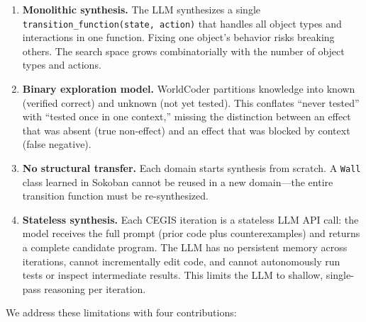 \documentclass{article}
\begin{document}
\begin{enumerate}[nosep]
    \item \textbf{Monolithic synthesis.}  The LLM synthesizes a single
          \texttt{transition\_function(state, action)} that handles all object
          types and interactions in one function.  Fixing one object's behavior
          risks breaking others.  The search space grows combinatorially with
          the number of object types and actions.

    \item \textbf{Binary exploration model.}  WorldCoder partitions knowledge
          into known (verified correct) and unknown (not yet tested).  This
          conflates ``never tested'' with ``tested once in one context,''
          missing the distinction between an effect that was absent (true
          non-effect) and an effect that was blocked by context (false negative).

    \item \textbf{No structural transfer.}  Each domain starts synthesis from
          scratch.  A \texttt{Wall} class learned in Sokoban cannot be reused in
          a new domain---the entire transition function must be re-synthesized.

    \item \textbf{Stateless synthesis.}  Each CEGIS iteration is a stateless
          LLM API call: the model receives the full prompt (prior code plus
          counterexamples) and returns a complete candidate program.  The LLM
          has no persistent memory across iterations, cannot incrementally edit
          code, and cannot autonomously run tests or inspect intermediate
          results.  This limits the LLM to shallow, single-pass reasoning
          per iteration.
\end{enumerate}

We address these limitations with four contributions:
\end{document}

